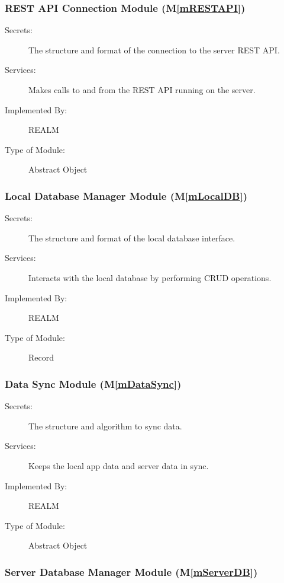 \documentclass[12pt, titlepage]{article}
\newcommand{\mref}[1]{M\ref{#1}}
\begin{document}
\subsubsection{REST API Connection Module (\mref{mRESTAPI})}

\begin{description}
\item[Secrets:]The structure and format of the connection to the server REST API.
\item[Services:]Makes calls to and from the REST API running on the server.
\item[Implemented By:]REALM
\item[Type of Module:]Abstract Object
\end{description}

\subsubsection{Local Database Manager Module (\mref{mLocalDB})}

\begin{description}
\item[Secrets:]The structure and format of the local database interface.
\item[Services:]Interacts with the local database by performing CRUD operations.
\item[Implemented By:]REALM
\item[Type of Module:]Record
\end{description}

\subsubsection{Data Sync Module (\mref{mDataSync})}

\begin{description}
\item[Secrets:]The structure and algorithm to sync data.
\item[Services:]Keeps the local app data and server data in sync. 
\item[Implemented By:]REALM
\item[Type of Module:]Abstract Object
\end{description}

\subsubsection{Server Database Manager Module (\mref{mServerDB})}
\end{document}
